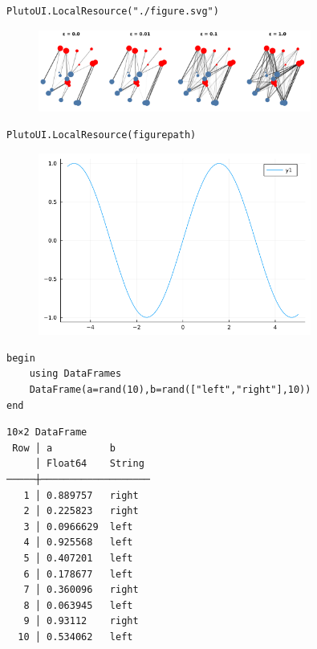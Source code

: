 \begin{lstlisting}[language=JuliaLocal, style=julia]
PlutoUI.LocalResource("./figure.svg")
\end{lstlisting}

\begin{figure}[H]
	\centering
	\includegraphics[width=0.8\textwidth]{./figures/figure}
	\label{fig:/home/davibarreira/MEGA/EMAp/NotebookToLatex.jl/test/pluto/./figure.svg}

\end{figure}

\begin{lstlisting}[language=JuliaLocal, style=julia]
PlutoUI.LocalResource(figurepath)
\end{lstlisting}

\begin{figure}[H]
	\centering
	\includegraphics[width=0.8\textwidth]{./figures/plotexample.png}
	\label{fig:/home/davibarreira/MEGA/EMAp/NotebookToLatex.jl/test/pluto/plotexample.png}

\end{figure}

\begin{lstlisting}[language=JuliaLocal, style=julia]
begin
	using DataFrames
	DataFrame(a=rand(10),b=rand(["left","right"],10))
end
\end{lstlisting}

\begin{verbatim}
10×2 DataFrame
 Row │ a          b
     │ Float64    String
─────┼───────────────────
   1 │ 0.889757   right
   2 │ 0.225823   right
   3 │ 0.0966629  left
   4 │ 0.925568   left
   5 │ 0.407201   left
   6 │ 0.178677   left
   7 │ 0.360096   right
   8 │ 0.063945   left
   9 │ 0.93112    right
  10 │ 0.534062   left
\end{verbatim}
